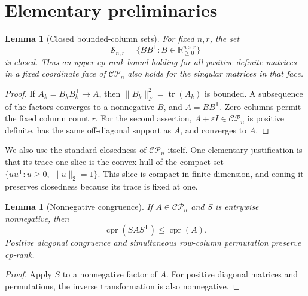 \documentclass[11pt,a4paper]{article}
\newtheorem{lemma}[theorem]{Lemma}
\theoremstyle{definition}
\newcommand{\CP}{\mathcal{CP}}
\newcommand{\R}{\mathbb{R}}
\DeclareMathOperator{\cpr}{cpr}
\DeclareMathOperator{\tr}{tr}
\newcommand{\T}{\mathsf T}
\begin{document}
\section{Elementary preliminaries}

\begin{lemma}[Closed bounded-column sets]\label{lem:closed}
For fixed $n,r$, the set
\[
 \mathcal S_{n,r}=\{BB^{\T}:B\in\R_{\geq0}^{n\times r}\}
\]
is closed. Thus an upper cp-rank bound holding for all positive-definite matrices in a fixed coordinate face of $\CP_n$ also holds for the singular matrices in that face.
\end{lemma}
\begin{proof}
If $A_k=B_kB_k^{\T}\to A$, then $\|B_k\|_F^2=\tr(A_k)$ is bounded. A subsequence of the factors converges to a nonnegative $B$, and $A=BB^{\T}$. Zero columns permit the fixed column count $r$. For the second assertion, $A+\varepsilon I\in\CP_n$ is positive definite, has the same off-diagonal support as $A$, and converges to $A$.
\end{proof}

We also use the standard closedness of $\CP_n$ itself. One elementary justification is that its trace-one slice is the convex hull of the compact set $\{uu^{\T}:u\geq0,\ \|u\|_2=1\}$. This slice is compact in finite dimension, and coning it preserves closedness because its trace is fixed at one.

\begin{lemma}[Nonnegative congruence]\label{lem:congruence}
If $A\in\CP_n$ and $S$ is entrywise nonnegative, then
\[
 \cpr(SAS^{\T})\leq\cpr(A).
\]
Positive diagonal congruence and simultaneous row-column permutation preserve cp-rank.
\end{lemma}
\begin{proof}
Apply $S$ to a nonnegative factor of $A$. For positive diagonal matrices and permutations, the inverse transformation is also nonnegative.
\end{proof}
\end{document}
